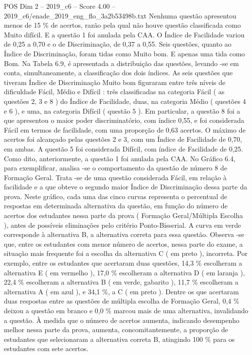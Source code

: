 \begin{textsample}{POS Dim 2 – 2019\_c6 – Score 4.00 – 2019\_c6/enade\_2019\_eng\_flo\_3a2b53498b.txt}
Nenhuma questão apresentou menos de 15 \% de acertos, razão pela qual não houve questão classificada como Muito difícil.
E a questão 1 foi anulada pela CAA.
O Índice de Facilidade variou de 0,25 a 0,70 e o de Discriminação, de 0,37 a 0,55.
Seis questões, quanto ao Índice de Discriminação, foram tidas como Muito bom.
E apenas uma tida como Bom.
Na Tabela 6.9, é apresentada a distribuição das questões, levando -se em conta, simultaneamente, a classificação dos dois índices.
As seis questões que tiveram Índice de Discriminação Muito bom figuraram entre três níveis de dificuldade Fácil, Médio e Difícil : três classificadas na categoria Fácil ( as questões 2, 3 e 8 ) do Índice de Facilidade, duas, na categoria Médio ( questões 4 e 6 ), e uma, na categoria Difícil ( questão 5 ).
Em particular, a questão 8 foi a que apresentou o maior poder discriminatório, com índice 0,55, e foi considerada Fácil em termos de facilidade, com uma proporção de 0,63 acertos.
O máximo de acertos foi alcançado pelas questões 2 e 3, com um Índice de Facilidade de 0,70, em ambas.
A questão 5 foi considerada Difícil, com índice de Facilidade de 0,25.
Como dito, anteriormente, a questão 1 foi anulada pela CAA.
No Gráfico 6.4, para exemplificar, analisa -se o comportamento da questão de número 8 de Formação Geral.
Trata -se de uma questão considerada Fácil, em relação à facilidade e a que obteve o segundo maior Índice de Discriminação dessa parte da prova.
Neste gráfico, cada uma das cinco curvas representa o percentual de respostas em determinada alternativa da questão, em função do número de acertos dos estudantes nessa parte da prova ( Formação Geral/Múltipla Escolha ), antes de possíveis eliminações pelo critério Ponto-Bisserial.
A curva em verde corresponde à alternativa B, a alternativa correta para essa questão.
Observa -se que, entre os estudantes com menor número de acertos, nessa parte do exame, a situação mais frequente foi a escolha da alternativa C ( em preto ), incorreta.
Por exemplo, entre os estudantes que acertaram duas questões, 14,3 \% escolheram a alternativa E ( em vermelho ), 17,0 \% escolheram a alternativa D ( em laranja ), 22,4 \% escolheram a alternativa B ( em verde, gabarito ), 11,7 \% escolheram a alternativa A ( em azul ), e 34,1 \%, a C ( em preto ).
Dentre os que acertaram duas respostas entre as questões de múltipla escolha de Formação Geral, 0,4 \% deixou a questão em branco e 0,0 \% marcou mais de uma alternativa, invalidando a questão.
À medida que o número de acertos aumenta, indicando desempenho melhor nessa parte da prova, aumenta, concomitantemente, a proporção de estudantes que selecionaram a alternativa correta B, atingindo 100 \% para os estudantes com sete acertos.

\end{textsample}
